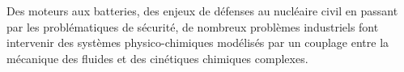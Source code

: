 Des moteurs aux batteries, des enjeux de défenses au nucléaire civil en passant par les problématiques de sécurité, de nombreux problèmes industriels 
font intervenir des systèmes physico-chimiques modélisés par un couplage entre la mécanique des fluides et des cinétiques chimiques complexes.
